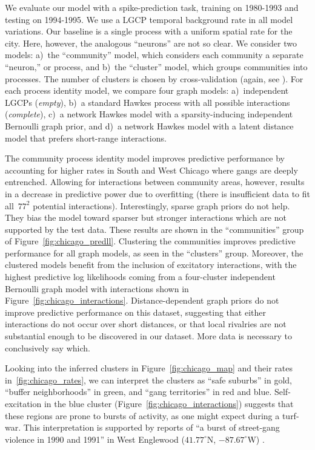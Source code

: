 We evaluate our model with a spike-prediction task, training on
1980-1993 and testing on 1994-1995. We use a LGCP temporal background
rate in all model variations. Our baseline is a single process with a
uniform spatial rate for the city. Here, however, the analogous ``neurons''
are not so clear. We consider two models:  a)~the ``community'' model, which considers each community a separate ``neuron,'' or process, and b)~the ``cluster'' model, which groups
communities into processes. The number of clusters is chosen by
cross-validation (again, see \citet{linderman2014discovering}).
For each process identity model, we compare four graph models: a)~independent LGCPs
(\emph{empty}), b)~a standard Hawkes process with all possible
interactions (\emph{complete}), c)~a network Hawkes model with a
sparsity-inducing independent Bernoulli graph prior, and d)~a network Hawkes
model with a latent distance model that prefers short-range
interactions.

The community process identity model improves predictive performance
by accounting for higher rates in South and West Chicago where gangs
are deeply entrenched. Allowing for interactions between community
areas, however, results in a decrease in predictive power due to
overfitting (there is insufficient data to fit all~${77^2}$ potential
interactions). Interestingly, sparse graph priors do not help. They
bias the model toward sparser but stronger interactions which are not
supported by the test data. These results are shown in the
``communities'' group of Figure~\ref{fig:chicago_predll}. Clustering
the communities improves predictive performance for all graph models,
as seen in the ``clusters'' group. Moreover, the clustered models
benefit from the inclusion of excitatory interactions, with the
highest predictive log likelihoods coming from a four-cluster
independent Bernoulli graph model with interactions shown in
Figure~\ref{fig:chicago_interactions}. Distance-dependent graph priors
do not improve predictive performance on this dataset, suggesting that
either interactions do not occur over short distances, or that local
rivalries are not substantial enough to be discovered in our
dataset. More data is necessary to conclusively say which.

Looking into the inferred clusters in Figure~\ref{fig:chicago_map} and
their rates in~\ref{fig:chicago_rates}, we can interpret the clusters
as ``safe suburbs'' in gold, ``buffer neighborhoods'' in green, and
``gang territories'' in red and blue. Self-excitation in the blue
cluster (Figure~\ref{fig:chicago_interactions}) suggests that these
regions are prone to bursts of activity, as one might expect during a
turf-war. This interpretation is supported by reports of ``a burst of
street-gang violence in 1990 and 1991'' in West Englewood
(${41.77^\circ}$N, ${-87.67^\circ}$W) \citep{Block-1993}.


